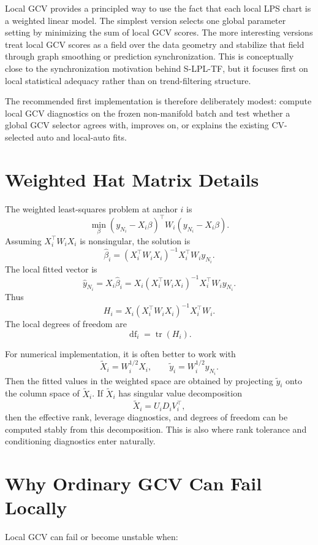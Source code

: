 \documentclass[11pt]{article}
\newcommand{\df}{\operatorname{df}}
\newcommand{\tr}{\operatorname{tr}}
\begin{document}
Local GCV provides a principled way to use the fact that each local LPS chart is
a weighted linear model.  The simplest version selects one global parameter
setting by minimizing the sum of local GCV scores.  The more interesting
versions treat local GCV scores as a field over the data geometry and stabilize
that field through graph smoothing or prediction synchronization.  This is
conceptually close to the synchronization motivation behind S-LPL-TF, but it
focuses first on local statistical adequacy rather than on trend-filtering
structure.

The recommended first implementation is therefore deliberately modest: compute
local GCV diagnostics on the frozen non-manifold batch and test whether a global
GCV selector agrees with, improves on, or explains the existing CV-selected
auto and local-auto fits.

\appendix
\section{Weighted Hat Matrix Details}

The weighted least-squares problem at anchor \(i\) is
\[
  \min_{\beta}
  (y_{N_i}-X_i\beta)^\top W_i(y_{N_i}-X_i\beta).
\]
Assuming \(X_i^\top W_iX_i\) is nonsingular, the solution is
\[
  \widehat\beta_i
  =
  (X_i^\top W_iX_i)^{-1}X_i^\top W_i y_{N_i}.
\]
The local fitted vector is
\[
  \widehat y_{N_i}
  =
  X_i\widehat\beta_i
  =
  X_i(X_i^\top W_iX_i)^{-1}X_i^\top W_i y_{N_i}.
\]
Thus
\[
  H_i
  =
  X_i(X_i^\top W_iX_i)^{-1}X_i^\top W_i.
\]
The local degrees of freedom are
\[
  \df_i = \tr(H_i).
\]

For numerical implementation, it is often better to work with
\[
  \widetilde X_i = W_i^{1/2}X_i,
  \qquad
  \widetilde y_i = W_i^{1/2}y_{N_i}.
\]
Then the fitted values in the weighted space are obtained by projecting
\(\widetilde y_i\) onto the column space of \(\widetilde X_i\).  If
\(\widetilde X_i\) has singular value decomposition
\[
  \widetilde X_i = U_iD_iV_i^\top,
\]
then the effective rank, leverage diagnostics, and degrees of freedom can be
computed stably from this decomposition.  This is also where rank tolerance and
conditioning diagnostics enter naturally.

\section{Why Ordinary GCV Can Fail Locally}

Local GCV can fail or become unstable when:
\end{document}
